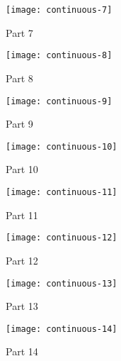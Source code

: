 \begin{figure}[ht]
    \begin{center}
    \texttt{[image: continuous-7]}
    \end{center}
    \caption{Part 7}
    \label{continuous-7}
\end{figure}

\begin{figure}[ht]
    \begin{center}
    \texttt{[image: continuous-8]}
    \end{center}
    \caption{Part 8}
    \label{continuous-8}
\end{figure}

\begin{figure}[ht]
    \begin{center}
    \texttt{[image: continuous-9]}
    \end{center}
    \caption{Part 9}
    \label{continuous-9}
\end{figure}

\begin{figure}[ht]
    \begin{center}
    \texttt{[image: continuous-10]}
    \end{center}
    \caption{Part 10}
    \label{continuous-10}
\end{figure}

\begin{figure}[ht]
    \begin{center}
    \texttt{[image: continuous-11]}
    \end{center}
    \caption{Part 11}
    \label{continuous-11}
\end{figure}

\begin{figure}[ht]
    \begin{center}
    \texttt{[image: continuous-12]}
    \end{center}
    \caption{Part 12}
    \label{continuous-12}
\end{figure}

\begin{figure}[ht]
    \begin{center}
    \texttt{[image: continuous-13]}
    \end{center}
    \caption{Part 13}
    \label{continuous-13}
\end{figure}

\begin{figure}[ht]
    \begin{center}
    \texttt{[image: continuous-14]}
    \end{center}
    \caption{Part 14}
    \label{continuous-14}
\end{figure}

